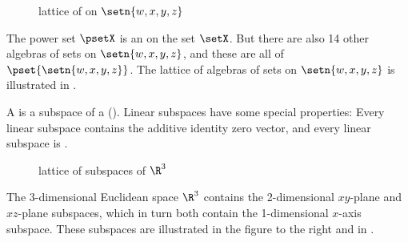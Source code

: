 %

\begin{figure}[th]
\begin{center}
\caption{%
  lattice of  on $\setn{w,x,y,z}$ 
  \label{fig:algsets_wxyz}
  }
\end{center}
\end{figure}

\begin{example}
\label{ex:algsets_wxyz}
The power set $\psetX$ is an  on the set $\setX$.
But there are also 14 other algebras of sets on $\setn{w,x,y,z}$, and these are all  of $\pset{\setn{w,x,y,z}}$.
The lattice of algebras of sets on $\setn{w,x,y,z}$ is illustrated in . 
\end{example}%


A  is a subspace of a  ().
Linear subspaces have some special properties: 
Every linear subspace contains the additive identity zero vector, and every linear subspace is .

\begin{figure}[th]
\begin{center}
%  
  \caption{lattice of subspaces of $\R^3$ \label{fig:latr3subspaces}}
\end{center}
\end{figure}
\begin{minipage}{\tw-63mm}
\begin{example}\label{ex:r3subspaces}
  The 3-dimensional Euclidean space $\R^3$ contains 
  the 2-dimensional $xy$-plane and $xz$-plane subspaces,
  which in turn both contain the 1-dimensional $x$-axis subspace.
  These subspaces are illustrated in the figure to the right and in .
\end{example}
\end{minipage}%
\hfill%
\begin{minipage}{60mm}%
  \begin{center}
  \footnotesize%
  \end{center}
\end{minipage}

